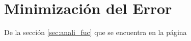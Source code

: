\chapter{Minimización del Error} \label{cap:min_error}
	\lipsum \lipsum[3]
	
	De la sección \ref{sec:anali_fuc} que se encuentra en la página \pageref{sec:anali_fuc} \lipsum[1]